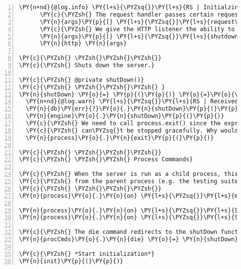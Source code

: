 \begin{Verbatim}[fontsize=\scriptsize,commandchars=\\\{\},numbers=left,firstnumber=1,stepnumber=1]
      \PY{n+nd}{@log.info} \PY{l+s}{\PYZsq{}}\PY{l+s}{RS | Initialzing http listener}\PY{l+s}{\PYZsq{}}
      \PY{c}{\PYZsh{} The request handler passes certain requests to the components manager}
      \PY{n}{args}\PY{p}{[} \PY{l+s}{\PYZsq{}}\PY{l+s}{request\PYZhy{}service}\PY{l+s}{\PYZsq{}} \PY{p}{]} \PY{o}{=} \PY{n}{cm}\PY{o}{.}\PY{n}{processRequest}
      \PY{c}{\PYZsh{} We give the HTTP listener the ability to shutdown the whole system}
      \PY{n}{args}\PY{p}{[} \PY{l+s}{\PYZsq{}}\PY{l+s}{shutdown\PYZhy{}function}\PY{l+s}{\PYZsq{}} \PY{p}{]} \PY{o}{=} \PY{n}{shutDown}
      \PY{n}{http} \PY{n}{args}
      
\PY{c}{\PYZsh{} \PYZsh{}\PYZsh{}\PYZsh{}}
\PY{c}{\PYZsh{} Shuts down the server.}

\PY{c}{\PYZsh{} @private shutDown()}
\PY{c}{\PYZsh{} \PYZsh{}\PYZsh{}\PYZsh{} }
\PY{n}{shutDown} \PY{o}{=} \PY{p}{(}\PY{p}{)} \PY{o}{=}\PY{o}{\PYZgt{}}
  \PY{n+nd}{@log.warn} \PY{l+s}{\PYZsq{}}\PY{l+s}{RS | Received shut down command!}\PY{l+s}{\PYZsq{}}
  \PY{n}{db}\PY{err}{?}\PY{o}{.}\PY{n}{shutDown}\PY{p}{(}\PY{p}{)}
  \PY{n}{engine}\PY{o}{.}\PY{n}{shutDown}\PY{p}{(}\PY{p}{)}
  \PY{c}{\PYZsh{} We need to call process.exit() since the express server in the http\PYZhy{}listener}
  \PY{c}{\PYZsh{} can\PYZsq{}t be stopped gracefully. Why would you stop this system anyways!?? }
  \PY{n}{process}\PY{o}{.}\PY{n}{exit}\PY{p}{(}\PY{p}{)}

\PY{c}{\PYZsh{} \PYZsh{}\PYZsh{}\PYZsh{}}
\PY{c}{\PYZsh{} \PYZsh{}\PYZsh{} Process Commands}

\PY{c}{\PYZsh{} When the server is run as a child process, this function handles messages}
\PY{c}{\PYZsh{} from the parent process (e.g. the testing suite)}
\PY{c}{\PYZsh{} \PYZsh{}\PYZsh{}\PYZsh{}}
\PY{n}{process}\PY{o}{.}\PY{n}{on} \PY{l+s}{\PYZsq{}}\PY{l+s}{message}\PY{l+s}{\PYZsq{}}\PY{p}{,} \PY{p}{(} \PY{n}{cmd} \PY{p}{)} \PY{o}{\PYZhy{}}\PY{o}{\PYZgt{}} \PY{n}{procCmds}\PY{p}{[}\PY{n}{cmd}\PY{p}{]}\PY{err}{?}\PY{p}{(}\PY{p}{)}

\PY{n}{process}\PY{o}{.}\PY{n}{on} \PY{l+s}{\PYZsq{}}\PY{l+s}{SIGINT}\PY{l+s}{\PYZsq{}}\PY{p}{,} \PY{n}{shutDown}
\PY{n}{process}\PY{o}{.}\PY{n}{on} \PY{l+s}{\PYZsq{}}\PY{l+s}{SIGTERM}\PY{l+s}{\PYZsq{}}\PY{p}{,} \PY{n}{shutDown}

\PY{c}{\PYZsh{} The die command redirects to the shutDown function.}
\PY{n}{procCmds}\PY{o}{.}\PY{n}{die} \PY{o}{=} \PY{n}{shutDown}

\PY{c}{\PYZsh{} *Start initialization*}
\PY{n}{init}\PY{p}{(}\PY{p}{)}
\end{Verbatim}








